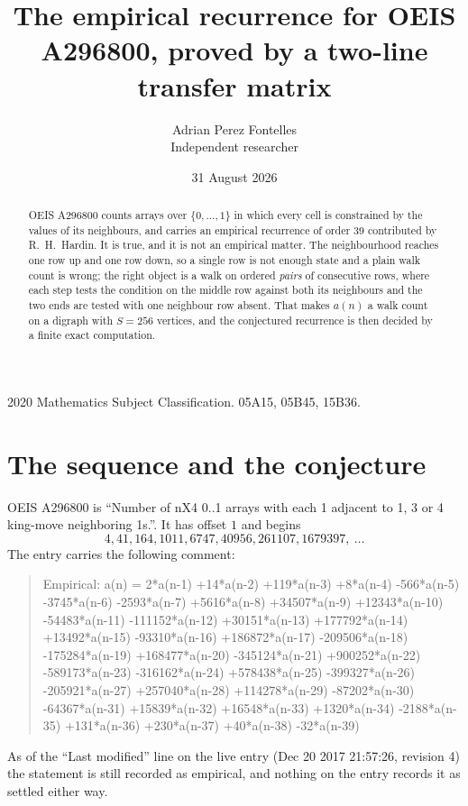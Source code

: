 \documentclass[11pt,a4paper]{article}
\title{The empirical recurrence for OEIS A296800, proved by a two-line transfer matrix}
\author{Adrian Perez Fontelles\\ \small Independent researcher}
\date{31 August 2026}
\theoremstyle{plain}
\theoremstyle{definition}
\begin{document}
\maketitle

\begin{abstract}
OEIS A296800 counts arrays over $\{0,\dots,1\}$ in which every cell is constrained by the
values of its neighbours, and carries an empirical recurrence of order $39$ contributed
by R.~H.~Hardin. It is true, and it is not an empirical matter. The neighbourhood reaches one
row up and one row down, so a single row is not enough state and a plain walk count
is wrong; the right object is a walk on ordered \emph{pairs} of consecutive rows, where
each step tests the condition on the middle row against both its neighbours and the two
ends are tested with one neighbour row absent. That makes $a(n)$ a walk count on a digraph
with $S=256$ vertices, and the conjectured recurrence is then decided by a finite exact
computation.
\end{abstract}

\noindent\small 2020 Mathematics Subject Classification. 05A15, 05B45, 15B36.\normalsize

\section{The sequence and the conjecture}

OEIS A296800 is ``Number of nX4 0..1 arrays with each 1 adjacent to 1, 3 or 4 king-move neighboring 1s.''. It has offset $1$ and begins
\[
4, 41, 164, 1011, 6747, 40956, 261107, 1679397,\ \dots
\]
The entry carries the following comment:
\begin{quote}\small
Empirical: a(n) = 2*a(n-1) +14*a(n-2) +119*a(n-3) +8*a(n-4) -566*a(n-5) -3745*a(n-6) -2593*a(n-7) +5616*a(n-8) +34507*a(n-9) +12343*a(n-10) -54483*a(n-11) -111152*a(n-12) +30151*a(n-13) +177792*a(n-14) +13492*a(n-15) -93310*a(n-16) +186872*a(n-17) -209506*a(n-18) -175284*a(n-19) +168477*a(n-20) -345124*a(n-21) +900252*a(n-22) -589173*a(n-23) -316162*a(n-24) +578438*a(n-25) -399327*a(n-26) -205921*a(n-27) +257040*a(n-28) +114278*a(n-29) -87202*a(n-30) -64367*a(n-31) +15839*a(n-32) +16548*a(n-33) +1320*a(n-34) -2188*a(n-35) +131*a(n-36) +230*a(n-37) +40*a(n-38) -32*a(n-39)
\end{quote}
As of the ``Last modified'' line on the live entry (Dec 20 2017 21:57:26, revision 4) the statement is
still recorded as empirical, and nothing on the entry records it as settled either way.
\end{document}
